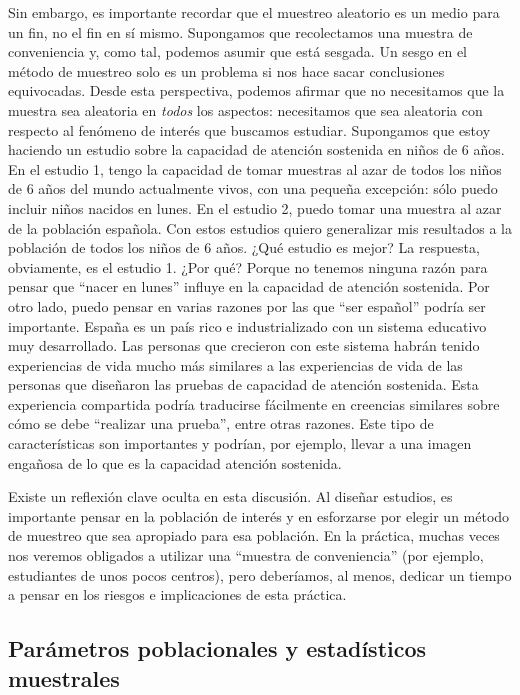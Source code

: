 \documentclass[spanish,]{book}
\begin{document}
Sin embargo, es importante recordar que el muestreo aleatorio es un
medio para un fin, no el fin en sí mismo. Supongamos que recolectamos
una muestra de conveniencia y, como tal, podemos asumir que está
sesgada. Un sesgo en el método de muestreo solo es un problema si nos
hace sacar conclusiones equivocadas. Desde esta perspectiva, podemos
afirmar que no necesitamos que la muestra sea aleatoria en \emph{todos}
los aspectos: necesitamos que sea aleatoria con respecto al fenómeno de
interés que buscamos estudiar. Supongamos que estoy haciendo un estudio
sobre la capacidad de atención sostenida en niños de 6 años. En el
estudio 1, tengo la capacidad de tomar muestras al azar de todos los
niños de 6 años del mundo actualmente vivos, con una pequeña excepción:
sólo puedo incluir niños nacidos en lunes. En el estudio 2, puedo tomar
una muestra al azar de la población española. Con estos estudios quiero
generalizar mis resultados a la población de todos los niños de 6 años.
¿Qué estudio es mejor? La respuesta, obviamente, es el estudio 1. ¿Por
qué? Porque no tenemos ninguna razón para pensar que ``nacer en lunes''
influye en la capacidad de atención sostenida. Por otro lado, puedo
pensar en varias razones por las que ``ser español'' podría ser
importante. España es un país rico e industrializado con un sistema
educativo muy desarrollado. Las personas que crecieron con este sistema
habrán tenido experiencias de vida mucho más similares a las
experiencias de vida de las personas que diseñaron las pruebas de
capacidad de atención sostenida. Esta experiencia compartida podría
traducirse fácilmente en creencias similares sobre cómo se debe
``realizar una prueba'', entre otras razones. Este tipo de
características son importantes y podrían, por ejemplo, llevar a una
imagen engañosa de lo que es la capacidad atención sostenida.

Existe un reflexión clave oculta en esta discusión. Al diseñar estudios,
es importante pensar en la población de interés y en esforzarse por
elegir un método de muestreo que sea apropiado para esa población. En la
práctica, muchas veces nos veremos obligados a utilizar una ``muestra de
conveniencia'' (por ejemplo, estudiantes de unos pocos centros), pero
deberíamos, al menos, dedicar un tiempo a pensar en los riesgos e
implicaciones de esta práctica.

\subsection{Parámetros poblacionales y estadísticos
muestrales}\label{parametros-poblacionales-y-estadisticos-muestrales}
\end{document}
